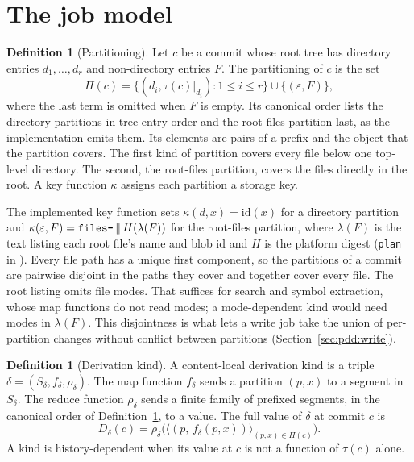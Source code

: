 \documentclass[11pt,letterpaper]{article}
\theoremstyle{definition}
\newtheorem{definition}[theorem]{Definition}
\theoremstyle{remark}
\newcommand{\id}{\mathrm{id}}
\newcommand{\tree}{\tau}
\DeclareRobustCommand{\code}[1]{{\def\_{\textunderscore\allowbreak}\texttt{#1}}}
\begin{document}
\section{The job model}
\label{sec:pdd:jobs}

\begin{definition}[Partitioning]
\label{def:pdd:partitioning}
Let $c$ be a commit whose root tree has directory entries $d_1,\ldots,d_r$ and non-directory entries $F$. The partitioning of $c$ is the set
\[
\Pi(c)=\{(d_i,\tree(c)|_{d_i}) : 1\le i\le r\}\cup\{(\varepsilon,F)\},
\]
where the last term is omitted when $F$ is empty. Its canonical order lists the directory partitions in tree-entry order and the root-files partition last, as the implementation emits them. Its elements are pairs of a prefix and the object that the partition covers. The first kind of partition covers every file below one top-level directory. The second, the root-files partition, covers the files directly in the root. A key function $\kappa$ assigns each partition a storage key.
\end{definition}

The implemented key function sets $\kappa(d,x)=\id(x)$ for a directory partition and $\kappa(\varepsilon,F)=\text{\code{files-}}\,\|\,H(\lambda(F))$ for the root-files partition, where $\lambda(F)$ is the text listing each root file's name and blob id and $H$ is the platform digest (\code{plan} in ). Every file path has a unique first component, so the partitions of a commit are pairwise disjoint in the paths they cover and together cover every file. The root listing omits file modes. That suffices for search and symbol extraction, whose map functions do not read modes; a mode-dependent kind would need modes in $\lambda(F)$. This disjointness is what lets a write job take the union of per-partition changes without conflict between partitions (Section~\ref{sec:pdd:write}).

\begin{definition}[Derivation kind]
\label{def:pdd:kind}
A content-local derivation kind is a triple $\delta=(S_\delta,f_\delta,\rho_\delta)$. The map function $f_\delta$ sends a partition $(p,x)$ to a segment in $S_\delta$. The reduce function $\rho_\delta$ sends a finite family of prefixed segments, in the canonical order of Definition~\ref{def:pdd:partitioning}, to a value. The full value of $\delta$ at commit $c$ is
\[
D_\delta(c)=\rho_\delta\bigl(\langle (p,\,f_\delta(p,x)) \rangle_{(p,x)\in\Pi(c)}\bigr).
\]
A kind is history-dependent when its value at $c$ is not a function of $\tree(c)$ alone.
\end{definition}
\end{document}
